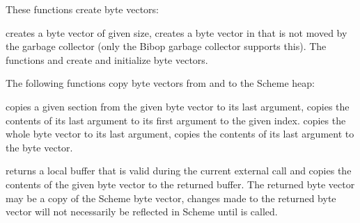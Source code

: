 These functions create byte vectors:

\begin{protos}
\end{protos}

 creates a byte vector of given size,
 creates a byte vector in
that is not moved by the garbage collector (only the Bibop garbage
collector supports this).  The functions
 and
 create and initialize
byte vectors.

The following functions copy byte vectors from and to the Scheme heap:

\begin{protos}
\end{protos}

 copies a given section
from the given byte vector to its last argument,
 copies the contents of its
last argument to its first argument to the given index.
 copies the whole byte vector
to its last argument,  copies the
contents of its last argument to the byte vector.

\begin{protos}
\end{protos}

 returns a local buffer
that is valid during the current external call and copies the contents
of the given byte vector to the returned buffer.  The returned byte
vector may be a copy of the Scheme byte vector, changes made to the
returned byte vector will not necessarily be reflected in Scheme until
 is called.

